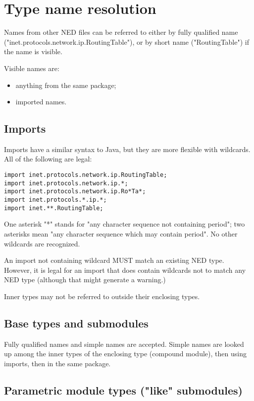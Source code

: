\section{Type name resolution}

Names from other NED files can be referred to either by fully qualified
name ("inet.protocols.network.ip.RoutingTable"), or by short name
("RoutingTable") if the name is visible.

Visible names are:
\begin{itemize}
  \item anything from the same package;
  \item imported names.
\end{itemize}

\subsection{Imports}

Imports have a similar syntax to Java, but they are more flexible with wildcards.
All of the following are legal:
\begin{verbatim}
import inet.protocols.network.ip.RoutingTable;
import inet.protocols.network.ip.*;
import inet.protocols.network.ip.Ro*Ta*;
import inet.protocols.*.ip.*;
import inet.**.RoutingTable;
\end{verbatim}

One asterisk "*" stands for "any character sequence not containing
period"; two asterisks mean "any character sequence which may
contain period". No other wildcards are recognized.

An import not containing wildcard MUST match an existing NED type.
However, it is legal for an import that does contain wildcards
not to match any NED type (although that might generate a warning.)

Inner types may not be referred to outside their enclosing types.

\subsection{Base types and submodules}

Fully qualified names and simple names are accepted. Simple names
are looked up among the inner types of the enclosing type (compound
module), then using imports, then in the same package.


\subsection{Parametric module types ("like" submodules)}


